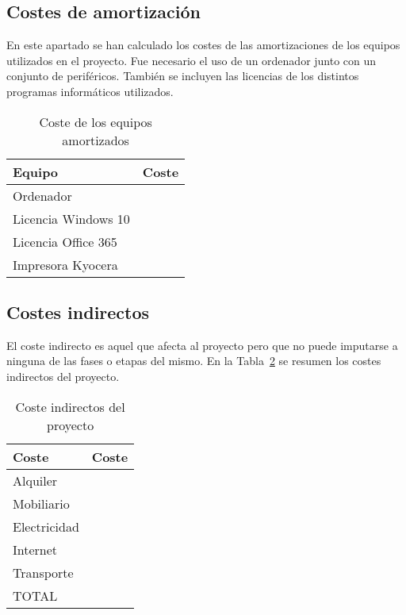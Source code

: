 \subsection{Costes de amortización}

En este apartado se han calculado los costes de las amortizaciones de los equipos utilizados en el proyecto.
Fue necesario el uso de un ordenador junto con un conjunto de periféricos.
También se incluyen las licencias de los distintos programas informáticos utilizados.

\begin{table}
    \centering
    \begin{tabular}{ll}
        \toprule
        Equipo              & Coste \\
        \midrule
        Ordenador           &       \\
        Licencia Windows 10 &       \\
        Licencia Office 365 &       \\
        Impresora Kyocera   &       \\
        \bottomrule
    \end{tabular}
    \caption{Coste de los equipos amortizados}
    \label{tab:coste-equipos}
\end{table}

\subsection{Costes indirectos}

El coste indirecto es aquel que afecta al proyecto pero que no puede imputarse a ninguna de las fases o etapas del mismo.
En la Tabla~\ref{tab:coste-indirecto} se resumen los costes indirectos del proyecto.

\begin{table}
    \centering
    \begin{tabular}{ll}
        \toprule
        Coste        & Coste \\
        \midrule
        Alquiler     &       \\
        Mobiliario   &       \\
        Electricidad &       \\
        Internet     &       \\
        Transporte   &       \\
        \midrule
        TOTAL        &       \\
        \bottomrule
    \end{tabular}
    \caption{Coste indirectos del proyecto}
    \label{tab:coste-indirecto}
\end{table}